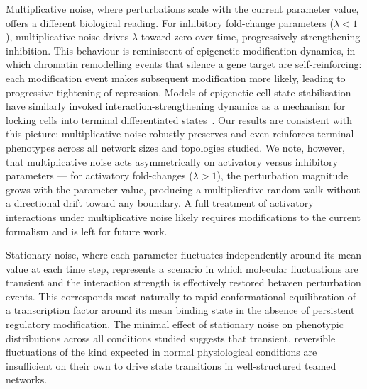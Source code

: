 \documentclass[11pt]{article}
\begin{document}
Multiplicative noise, where perturbations scale with the current parameter value, offers a different biological reading. For inhibitory fold-change parameters ($\lambda < 1$), multiplicative noise drives $\lambda$ toward zero over time, progressively strengthening inhibition. This behaviour is reminiscent of epigenetic modification dynamics, in which chromatin remodelling events that silence a gene target are self-reinforcing: each modification event makes subsequent modification more likely, leading to progressive tightening of repression. Models of epigenetic cell-state stabilisation have similarly invoked interaction-strengthening dynamics as a mechanism for locking cells into terminal differentiated states~\cite{Jia2019, Jia2020EpigeneticEMT}. Our results are consistent with this picture: multiplicative noise robustly preserves and even reinforces terminal phenotypes across all network sizes and topologies studied. We note, however, that multiplicative noise acts asymmetrically on activatory versus inhibitory parameters — for activatory fold-changes ($\lambda > 1$), the perturbation magnitude grows with the parameter value, producing a multiplicative random walk without a directional drift toward any boundary. A full treatment of activatory interactions under multiplicative noise likely requires modifications to the current formalism and is left for future work.

Stationary noise, where each parameter fluctuates independently around its mean value at each time step, represents a scenario in which molecular fluctuations are transient and the interaction strength is effectively restored between perturbation events. This corresponds most naturally to rapid conformational equilibration of a transcription factor around its mean binding state in the absence of persistent regulatory modification. The minimal effect of stationary noise on phenotypic distributions across all conditions studied suggests that transient, reversible fluctuations of the kind expected in normal physiological conditions are insufficient on their own to drive state transitions in well-structured teamed networks.
\end{document}
